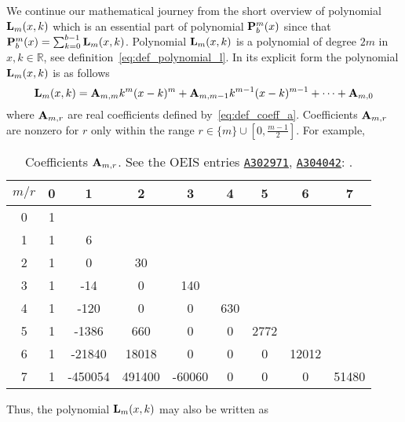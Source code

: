 \label{sec:polynomial-p-and-their-properties}
We continue our mathematical journey from the short overview
of polynomial ${\mathbf{L}}\sb{m}(x,k)$ which is
an essential part of polynomial ${\mathbf{P}}\sp{m} \sb{b}(x)$ since that
${\mathbf{P}}\sp{m} \sb{b}(x) = \sum_{k=0}^{b-1} {\mathbf{L}}\sb{m}(x,k)$.
Polynomial ${\mathbf{L}}\sb{m}(x,k)$ is a polynomial of degree $2m$ in $x,k\in\mathbb{R}$,
see definition~\eqref{eq:def_polynomial_l}.
In its explicit form the polynomial ${\mathbf{L}}\sb{m}(x,k)$ is as follows
\begin{equation*}
    {\mathbf{L}}\sb{m}(x,k) =
    {\mathbf{A}} \sb{m,m} k^m(x-k)^m +
    {\mathbf{A}} \sb{m,m-1} k^{m-1}(x-k)^{m-1} +
    \cdots +
    {\mathbf{A}} \sb{m,0}
\end{equation*}
where ${\mathbf{A}} \sb{m,r}$ are real coefficients defined by~\eqref{eq:def_coeff_a}.
Coefficients ${\mathbf{A}} \sb{m,r}$ are nonzero for $r$ only within the range $r \in \{m\} \cup \left[0,\frac{m-1}{2}\right]$.
For example,
\begin{table}[H]
    \setlength\extrarowheight{-6pt}
    \begin{tabular}{c|cccccccc}
        $m/r$ & 0 & 1       & 2      & 3      & 4   & 5    & 6     & 7     \\
        \hline
        0     & 1 &         &        &        &     &      &       &       \\
        1     & 1 & 6       &        &        &     &      &       &       \\
        2     & 1 & 0       & 30     &        &     &      &       &       \\
        3     & 1 & -14     & 0      & 140    &     &      &       &       \\
        4     & 1 & -120    & 0      & 0      & 630 &      &       &       \\
        5     & 1 & -1386   & 660    & 0      & 0   & 2772 &       &       \\
        6     & 1 & -21840  & 18018  & 0      & 0   & 0    & 12012 &       \\
        7     & 1 & -450054 & 491400 & -60060 & 0   & 0    & 0     & 51480
    \end{tabular}
    \caption{Coefficients ${\mathbf{A}} \sb{m,r}$. See the OEIS entries
    \href{https://oeis.org/A302971}{\texttt{A302971}},
        \href{https://oeis.org/A304042}{\texttt{A304042}}: \cite{kolosov2018numerator, kolosov2018denominator}.}
    \label{tab:table_of_coefficients_a}
\end{table}
Thus, the polynomial ${\mathbf{L}}\sb{m}(x,k)$ may also be written as
